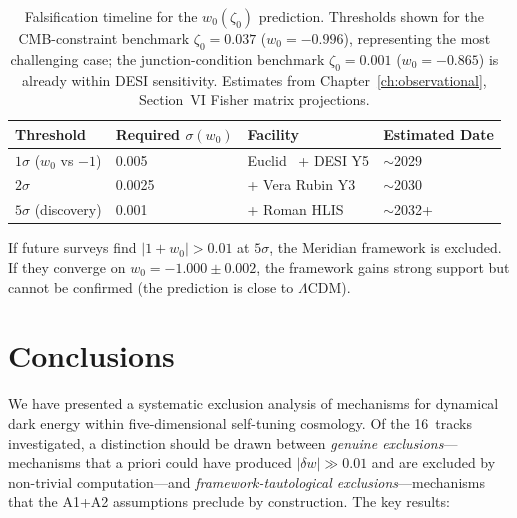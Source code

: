 \begin{table}[htbp]
\centering
\caption{Falsification timeline for the $w_0(\zeta_0)$ prediction. Thresholds shown for the CMB-constraint benchmark $\zeta_0 = 0.037$ ($w_0 = -0.996$), representing the most challenging case; the junction-condition benchmark $\zeta_0 = 0.001$ ($w_0 = -0.865$) is already within DESI sensitivity. Estimates from Chapter~\ref{ch:observational}, Section~VI Fisher matrix projections.}
\label{tab:3-falsification}
\begin{tabular}{@{}llll@{}}
\toprule
Threshold & Required $\sigma(w_0)$ & Facility & Estimated Date \\
\midrule
$1\sigma$ ($w_0$ vs $-1$) & 0.005  & Euclid~\cite{ch3:euclid2020} + DESI Y5             & $\sim$2029  \\
$2\sigma$                  & 0.0025 & + Vera Rubin Y3~\cite{ch3:lsst2009}                 & $\sim$2030  \\
$5\sigma$ (discovery)      & 0.001  & + Roman HLIS~\cite{ch3:spergel2015}                 & $\sim$2032+ \\
\bottomrule
\end{tabular}
\end{table}

If future surveys find $|1 + w_0| > 0.01$ at $5\sigma$, the Meridian framework is excluded. If they converge on $w_0 = -1.000 \pm 0.002$, the framework gains strong support but cannot be confirmed (the prediction is close to $\Lambda$CDM).

\section{Conclusions}
\label{sec:3-conclusions}

We have presented a systematic exclusion analysis of mechanisms for dynamical dark energy within five-dimensional self-tuning cosmology. Of the 16~tracks investigated, a distinction should be drawn between \emph{genuine exclusions}---mechanisms that a priori could have produced $|\delta w| \gg 0.01$ and are excluded by non-trivial computation---and \emph{framework-tautological exclusions}---mechanisms that the A1+A2 assumptions preclude by construction. The key results:

